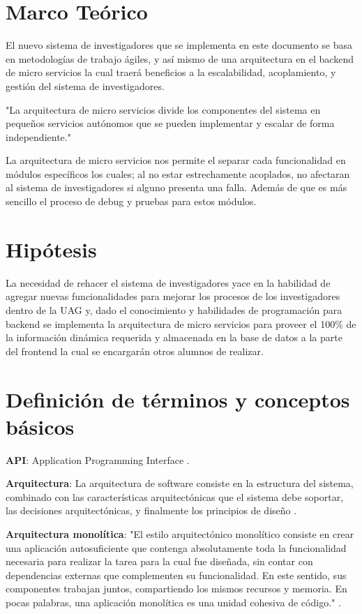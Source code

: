 \section{Marco Teórico}

    El nuevo sistema de investigadores que se implementa en este documento se basa en metodologías de trabajo ágiles, y así mismo de una arquitectura en el backend de micro servicios la cual traerá beneficios a la escalabilidad, acoplamiento, y gestión del sistema de investigadores.
    
    "La arquitectura de micro servicios divide los componentes del sistema en pequeños servicios autónomos que se pueden implementar y escalar de forma independiente."\cite{KryptonSolid}

    La arquitectura de micro servicios nos permite el separar cada funcionalidad en módulos específicos los cuales; al no estar estrechamente acoplados, no afectaran al sistema de investigadores si alguno presenta una falla. Además de que es más sencillo el proceso de debug y pruebas para estos módulos.

\section{Hipótesis}

    La necesidad de rehacer el sistema de investigadores yace en la habilidad de agregar nuevas funcionalidades para mejorar los procesos de los investigadores dentro de la UAG y, dado el conocimiento y habilidades de programación para backend se implementa la arquitectura de micro servicios para proveer el 100\% de la información dinámica requerida y almacenada en la base de datos a la parte del frontend la cual se encargarán otros alumnos de realizar.

\section{Definición de términos y conceptos básicos}

    \textbf{API}: Application Programming Interface \cite{jacobson2012apis}.

    \textbf{Arquitectura}: La arquitectura de software consiste en la estructura del sistema, combinado con las características arquitectónicas que el sistema debe soportar, las decisiones arquitectónicas, y finalmente los principios de diseño \cite{richards2020fundamentals}.
    
    \textbf{Arquitectura monolítica}: "El estilo arquitectónico monolítico consiste en crear una aplicación autosuficiente que contenga absolutamente toda la funcionalidad necesaria para realizar la tarea para la cual fue diseñada, sin contar con dependencias externas que complementen su funcionalidad. En este sentido, sus componentes trabajan juntos, compartiendo los mismos recursos y memoria. En pocas palabras, una aplicación monolítica es una unidad cohesiva de código." \cite{monolitic}.

